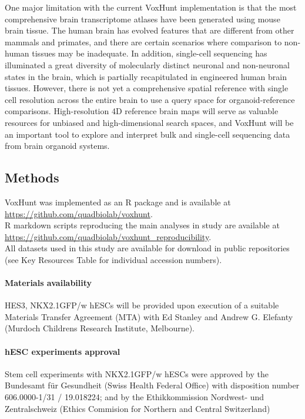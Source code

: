 One major limitation with the current VoxHunt implementation is that the most comprehensive brain transcriptome atlases have been generated using mouse brain tissue. The human brain has evolved features that are different from other mammals and primates, and there are certain scenarios where comparison to non-human tissues may be inadequate. In addition, single-cell sequencing has illuminated a great diversity of molecularly distinct neuronal and non-neuronal states in the brain, which is partially recapitulated in engineered human brain tissues. However, there is not yet a comprehensive spatial reference with single cell resolution across the entire brain to use a query space for organoid-reference comparisons. High-resolution 4D reference brain maps will serve as valuable resources for unbiased and high-dimensional search spaces, and VoxHunt will be an important tool to explore and interpret bulk and single-cell sequencing data from brain organoid systems. 


\subsection{Methods}

VoxHunt was implemented as an R package and is available at\\\href{https://github.com/quadbiolab/voxhunt}{https://github.com/quadbiolab/voxhunt}. \\
R markdown scripts reproducing the main analyses in study are available at\\ 
\href{https://github.com/quadbiolab/voxhunt_reproducibility}{https://github.com/quadbiolab/voxhunt\_reproducibility}.\\
All datasets used in this study are available for download in public repositories (see Key Resources Table for individual accession numbers). 

\paragraph{Materials availability}
HES3, NKX2.1GFP/w hESCs will be provided upon execution of a suitable Materials Transfer Agreement (MTA) with Ed Stanley and Andrew G. Elefanty (Murdoch Childrens Research Institute, Melbourne).

\paragraph{hESC experiments approval}
Stem cell experiments with NKX2.1GFP/w hESCs were approved by the Bundesamt für Gesundheit (Swiss Health Federal Office) with disposition number 606.0000-1/31 / 19.018224; and by the Ethikkommission Nordwest- und Zentralschweiz (Ethics Commision for Northern and Central Switzerland)

